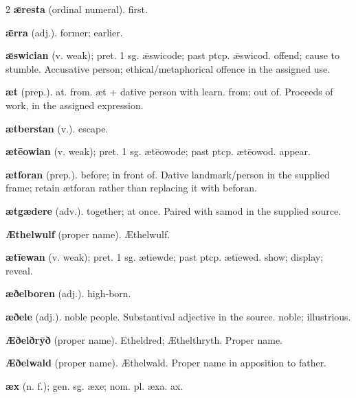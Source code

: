 \begin{multicols*}{2}
\textbf{ǣresta} (ordinal numeral). first.\par
\textbf{ǣrra} (adj.). former; earlier.\par
\textbf{ǣswician} (v. weak); pret. 1 sg. ǣswicode; past ptcp. ǣswicod. offend; cause to stumble. Accusative person; ethical/metaphorical offence in the assigned use.\par
\textbf{æt} (prep.). at. from. æt + dative person with learn. from; out of. Proceeds of work, in the assigned expression.\par
\textbf{ætberstan} (v.). escape.\par
\textbf{ætēowian} (v. weak); pret. 1 sg. ætēowode; past ptcp. ætēowod. appear.\par
\textbf{ætforan} (prep.). before; in front of. Dative landmark/person in the supplied frame; retain ætforan rather than replacing it with beforan.\par
\textbf{ætgædere} (adv.). together; at once. Paired with samod in the supplied source.\par
\textbf{Æthelwulf} (proper name). Æthelwulf.\par
\textbf{ætīewan} (v. weak); pret. 1 sg. ætīewde; past ptcp. ætīewed. show; display; reveal.\par
\textbf{æðelboren} (adj.). high-born.\par
\textbf{æðele} (adj.). noble people. Substantival adjective in the source. noble; illustrious.\par
\textbf{Æðelðrȳð} (proper name). Etheldred; Æthelthryth. Proper name.\par
\textbf{Æðelwald} (proper name). Æthelwald. Proper name in apposition to father.\par
\textbf{æx} (n. f.); gen. sg. æxe; nom. pl. æxa. ax.\par

\end{multicols*}
